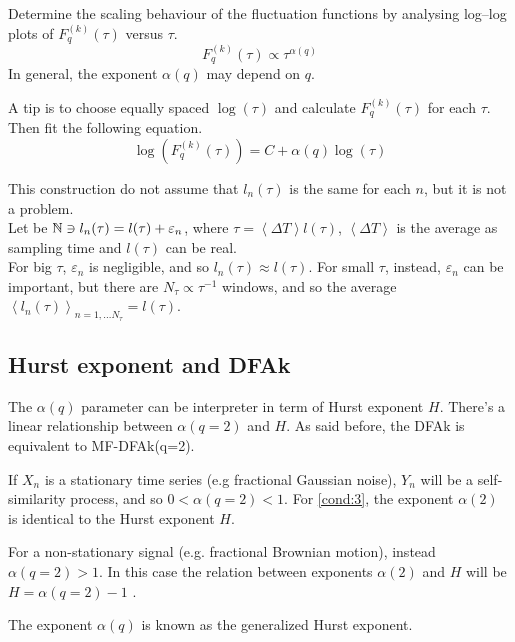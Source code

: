 \begin{step}\label{step5}
Determine the scaling behaviour of the fluctuation functions by analysing
log–log plots of $F_q^{( k )}(\tau )$ versus $\tau$.
\begin{equation}
	F_q^{( k )}(\tau ) \propto \tau^{\alpha(q)}
\end{equation}
In general, the exponent $\alpha(q)$ may depend on $q$. 

A tip is to choose equally spaced $\log(\tau)$ and calculate $F_q^{( k )}(\tau )$ for each $\tau$. Then fit the following equation.
\begin{equation}
	\log(F_q^{( k )}(\tau )) = C + \alpha(q) \log(\tau)
\end{equation}

This construction do not assume that $l_n(\tau)$ is the same for each $n$, but it is not a problem. \\
Let be $\mathbb{N} \ni l_n(\tau) = l(\tau) + \varepsilon_n$, where $\tau = \left< \Delta T\right> l(\tau)$, $\left< \Delta T\right>$ is the average as sampling time and $l(\tau)$ can be real. \\
For big $\tau$, $\varepsilon_n$ is negligible, and so $l_n(\tau) \approx l(\tau)$. For small $\tau$, instead, $\varepsilon_n$ can be important, but there are $N_{\tau} \propto \tau^{-1}$ windows, and so the average $\left< l_n(\tau) \right>_{n = 1, \dots N_{\tau}} = l(\tau)$.
\end{step}

\subsection{Hurst exponent and DFAk}\label{sec:hdfa}
The $\alpha(q)$ parameter can be interpreter in term of Hurst exponent $H$. There's a linear relationship between $\alpha(q=2)$ and $H$. As said before, the DFAk is equivalent to MF-DFAk(q=2).

If $X_n$ is a stationary time series (e.g fractional Gaussian noise), $Y_n$ will be a self-similarity process, and so $0 < \alpha(q = 2) < 1$. For \autoref{cond:3}, the exponent $\alpha(2)$ is identical to the Hurst exponent $H$.

For a non-stationary signal (e.g. fractional Brownian motion), instead $\alpha(q = 2) > 1$. In this case the relation between exponents $\alpha(2)$ and $H$ will be $H = \alpha(q = 2)-1$ \cite{Movahed_2006}.  

The exponent $\alpha(q)$ is known as the generalized Hurst exponent.